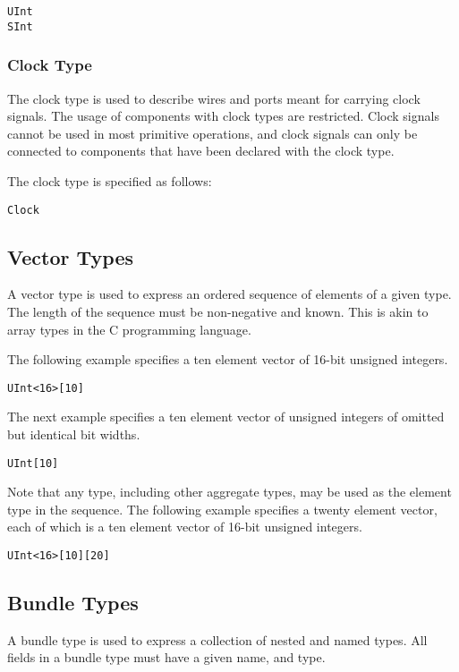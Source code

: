 \documentclass[12pt]{article}
\begin{document}
\begin{verbatim}
UInt
SInt
\end{verbatim}  

\subsubsection{Clock Type}

The clock type is used to describe wires and ports meant for carrying clock signals. The usage of components with clock types are restricted. Clock signals cannot be used in most primitive operations, and clock signals can only be connected to components that have been declared with the clock type. 

The clock type is specified as follows:
\begin{verbatim}
Clock
\end{verbatim}  

\subsection{Vector Types}

A vector type is used to express an ordered sequence of elements of a given type. The length of the sequence must be non-negative and known. This is akin to array types in the C programming language.

The following example specifies a ten element vector of 16-bit unsigned integers.
\begin{verbatim}
UInt<16>[10]
\end{verbatim}  

The next example specifies a ten element vector of unsigned integers of omitted but identical bit widths.
\begin{verbatim}
UInt[10]
\end{verbatim}

Note that any type, including other aggregate types, may be used as the element type in the sequence. The following example specifies a twenty element vector, each of which is a ten element vector of 16-bit unsigned integers.
\begin{verbatim}
UInt<16>[10][20]
\end{verbatim} 

\subsection{Bundle Types}

A bundle type is used to express a collection of nested and named types. All fields in a bundle type must have a given name, and type. 
\end{document}
